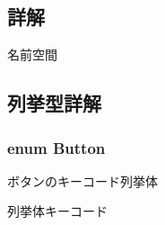 \subsection{詳解}
名前空間 

\subsection{列挙型詳解}
\subsubsection[{\texorpdfstring{Button}{Button}}]{\setlength{\rightskip}{0pt plus 5cm}enum {\bf Button}}\hypertarget{namespace_key_code_a03bfec859eac87be20f8952c1eb89de0}{}\label{namespace_key_code_a03bfec859eac87be20f8952c1eb89de0}


ボタンのキーコード列挙体 

列挙体キーコード 